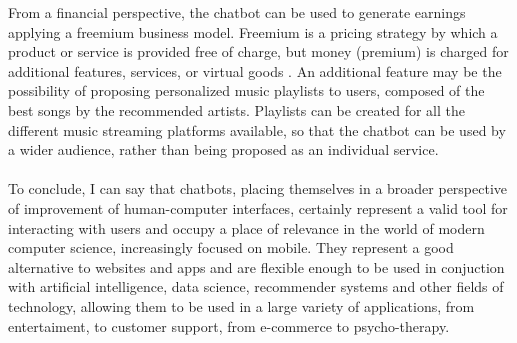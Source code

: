 \documentclass[b5paper,10pt,twoside,cucitura]{toptesi}
\begin{document}

From a financial perspective, the chatbot can be used to generate earnings applying a freemium business model. Freemium is a pricing strategy by which a product or service is provided free of charge, but money (premium) is charged for additional features, services, or virtual goods   \citep{freemium}. An additional feature may be the possibility of proposing personalized music playlists to users, composed of the best songs by the recommended artists. Playlists can be created for all the different music streaming platforms available, so that the chatbot can be used by a wider audience, rather than being proposed as an individual service.
\\
\\
To conclude, I can say that chatbots, placing themselves in a broader perspective of improvement of human-computer interfaces, certainly represent a valid tool for interacting with users and occupy a place of relevance in the world of modern computer science, increasingly focused on mobile. They represent a good alternative to websites and apps and are flexible enough to be used in conjuction with artificial intelligence, data science, recommender systems and other fields of technology, allowing them to be used in a large variety of applications, from entertaiment, to customer support, from e-commerce to psycho-therapy. 



\end{document}
